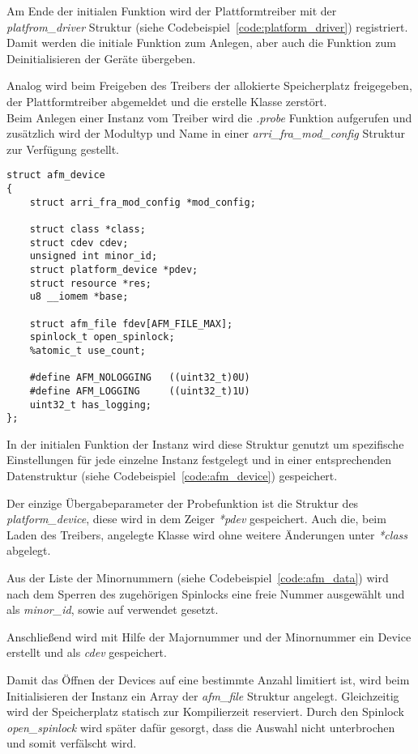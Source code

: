 Am Ende der initialen Funktion wird der Plattformtreiber mit der \textit{platfrom\_driver} Struktur (siehe Codebeispiel~\ref{code:platform_driver}) registriert. Damit werden die initiale Funktion zum Anlegen, aber auch die Funktion zum Deinitialisieren der Geräte übergeben.


Analog wird beim Freigeben des Treibers der allokierte Speicherplatz freigegeben, der Plattformtreiber abgemeldet und die erstelle Klasse zerstört.\\


Beim Anlegen einer Instanz vom Treiber wird die \textit{.probe} Funktion aufgerufen und zusätzlich wird der Modultyp und Name in einer \textit{arri\_fra\_mod\_config} Struktur zur Verfügung gestellt.
\begin{lstlisting}
struct afm_device 
{
	struct arri_fra_mod_config *mod_config;
	
	struct class *class;
	struct cdev cdev;
	unsigned int minor_id;
	struct platform_device *pdev;
	struct resource *res;
	u8 __iomem *base;
	
	struct afm_file fdev[AFM_FILE_MAX];
	spinlock_t open_spinlock;
	%atomic_t use_count;
	
	#define AFM_NOLOGGING   ((uint32_t)0U)
	#define AFM_LOGGING     ((uint32_t)1U)
	uint32_t has_logging;
};
\end{lstlisting}

In der initialen Funktion der Instanz wird diese Struktur genutzt um spezifische Einstellungen für jede einzelne Instanz festgelegt und in einer entsprechenden Datenstruktur (siehe Codebeispiel~\ref{code:afm_device}) gespeichert. 


Der einzige Übergabeparameter der Probefunktion ist die Struktur des \textit{platform\_device}, diese wird in dem Zeiger \textit{*pdev} gespeichert. Auch die, beim Laden des Treibers, angelegte Klasse wird ohne weitere Änderungen unter \textit{*class} abgelegt. 

Aus der Liste der Minornummern (siehe Codebeispiel~\ref{code:afm_data}) wird nach dem Sperren des zugehörigen Spinlocks eine freie Nummer ausgewählt und als \textit{minor\_id}, sowie auf verwendet gesetzt. 

Anschließend wird mit Hilfe der Majornummer und der Minornummer ein Device erstellt und als \textit{cdev} gespeichert. 

Damit das Öffnen der Devices auf eine bestimmte Anzahl limitiert ist, wird beim Initialisieren der Instanz ein Array der \textit{afm\_file} Struktur angelegt. Gleichzeitig wird der Speicherplatz statisch zur Kompilierzeit reserviert. Durch den Spinlock \textit{open\_spinlock} wird später dafür gesorgt, dass die Auswahl nicht unterbrochen und somit verfälscht wird.

